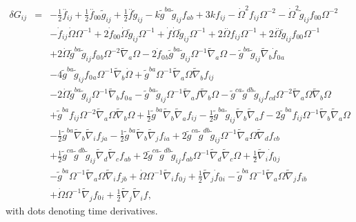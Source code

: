 \begin{eqnarray}
\\
\nonumber\\
\delta G_{ij}&=& - \tfrac{1}{2} \overset{..}{f}_{ij} + \tfrac{1}{2} \overset{..}{f}_{00}{} \tilde{g}_{ij} + \tfrac{1}{2} \overset{..}{f} \tilde{g}_{ij} -  k \tilde{g}^{ba} \tilde{g}_{ij} f_{ab} + 3 k f_{ij} -  \dot{\Omega}^2 f_{ij} \Omega^{-2} -  \dot{\Omega}^2 \tilde{g}_{ij} f_{00}{} \Omega^{-2} 
\nonumber\\
&& -  \dot{f}_{ij} \dot{\Omega} \Omega^{-1}  + 2 \dot{f}_{00}{} \dot{\Omega} \tilde{g}_{ij} \Omega^{-1} + \dot{f} \dot{\Omega} \tilde{g}_{ij} \Omega^{-1} + 2 \overset{..}{\Omega} f_{ij} \Omega^{-1} + 2 \overset{..}{\Omega} \tilde{g}_{ij} f_{00}{} \Omega^{-1} 
\nonumber\\
&& + 2 \dot{\Omega} \tilde{g}^{ba} \tilde{g}_{ij} f_{0}{}_{b} \Omega^{-2} \tilde{\nabla}_{a}\Omega  - 2 \dot{f}_{0}{}_{b} \tilde{g}^{ba} \tilde{g}_{ij} \Omega^{-1} \tilde{\nabla}_{a}\Omega -  \tilde{g}^{ba} \tilde{g}_{ij} \tilde{\nabla}_{b}\dot{f}_{0}{}_{a} 
\nonumber\\
&& - 4 \tilde{g}^{ba} \tilde{g}_{ij} f_{0}{}_{a} \Omega^{-1} \tilde{\nabla}_{b}\dot{\Omega} + \tilde{g}^{ba} \Omega^{-1} \tilde{\nabla}_{a}\Omega \tilde{\nabla}_{b}f_{ij} \nonumber \\ 
&& - 2 \dot{\Omega} \tilde{g}^{ba} \tilde{g}_{ij} \Omega^{-1} \tilde{\nabla}_{b}f_{0}{}_{a} -  \tilde{g}^{ba} \tilde{g}_{ij} \Omega^{-1} \tilde{\nabla}_{a}f \tilde{\nabla}_{b}\Omega -  \tilde{g}^{ca} \tilde{g}^{db} \tilde{g}_{ij} f_{cd} \Omega^{-2} \tilde{\nabla}_{a}\Omega \tilde{\nabla}_{b}\Omega \nonumber \\ 
&& + \tilde{g}^{ba} f_{ij} \Omega^{-2} \tilde{\nabla}_{a}\Omega \tilde{\nabla}_{b}\Omega + \tfrac{1}{2} \tilde{g}^{ba} \tilde{\nabla}_{b}\tilde{\nabla}_{a}f_{ij} -  \tfrac{1}{2} \tilde{g}^{ba} \tilde{g}_{ij} \tilde{\nabla}_{b}\tilde{\nabla}_{a}f - 2 \tilde{g}^{ba} f_{ij} \Omega^{-1} \tilde{\nabla}_{b}\tilde{\nabla}_{a}\Omega \nonumber \\ 
&& -  \tfrac{1}{2} \tilde{g}^{ba} \tilde{\nabla}_{b}\tilde{\nabla}_{i}f_{ja} -  \tfrac{1}{2} \tilde{g}^{ba} \tilde{\nabla}_{b}\tilde{\nabla}_{j}f_{ia} + 2 \tilde{g}^{ca} \tilde{g}^{db} \tilde{g}_{ij} \Omega^{-1} \tilde{\nabla}_{a}\Omega \tilde{\nabla}_{d}f_{cb} 
\nonumber\\
&& + \tfrac{1}{2} \tilde{g}^{ca} \tilde{g}^{db} \tilde{g}_{ij} \tilde{\nabla}_{d}\tilde{\nabla}_{c}f_{ab}  + 2 \tilde{g}^{ca} \tilde{g}^{db} \tilde{g}_{ij} f_{ab} \Omega^{-1} \tilde{\nabla}_{d}\tilde{\nabla}_{c}\Omega + \tfrac{1}{2} \tilde{\nabla}_{i}\dot{f}_{0}{}_{j} 
\nonumber\\
&& -  \tilde{g}^{ba} \Omega^{-1} \tilde{\nabla}_{a}\Omega \tilde{\nabla}_{i}f_{jb} + \dot{\Omega} \Omega^{-1} \tilde{\nabla}_{i}f_{0}{}_{j} + \tfrac{1}{2} \tilde{\nabla}_{j}\dot{f}_{0}{}_{i} -  \tilde{g}^{ba} \Omega^{-1} \tilde{\nabla}_{a}\Omega \tilde{\nabla}_{j}f_{ib}
\nonumber\\
&&  + \dot{\Omega} \Omega^{-1} \tilde{\nabla}_{j}f_{0}{}_{i} + \tfrac{1}{2} \tilde{\nabla}_{j}\tilde{\nabla}_{i}f,
\label{dg_conf31}
\end{eqnarray}
with dots denoting time derivatives. 
